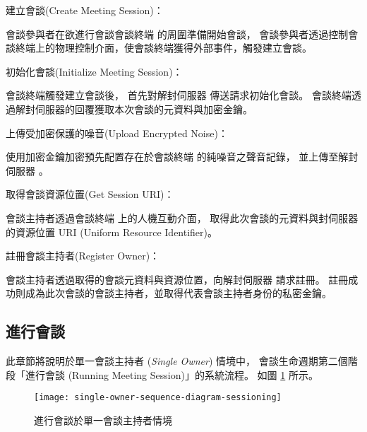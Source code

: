\begin{steps}
    \item 建立會談(Create Meeting Session)：

            會談參與者在欲進行會談會談終端 \DEFmeetingbox 的周圍準備開始會談，
        會談參與者透過控制會談終端上的物理控制介面，使會談終端獲得外部事件，觸發建立會談。

    \item 初始化會談(Initialize Meeting Session)：

            會談終端觸發建立會談後，
        首先對解封伺服器 \DEFserver 傳送請求初始化會談。
        會談終端透過解封伺服器的回覆獲取本次會談的元資料與加密金鑰。

    \item 上傳受加密保護的噪音(Upload Encrypted Noise)：

            使用加密金鑰加密預先配置存在於會談終端 \DEFmeetingbox 的純噪音之聲音記錄，
        並上傳至解封伺服器 \DEFserver。

    \item 取得會談資源位置(Get Session URI)：

            會談主持者透過會談終端 \DEFmeetingbox 上的人機互動介面，
        取得此次會談的元資料與封伺服器的資源位置 URI (Uniform Resource Identifier)。

    \item 註冊會談主持者(Register Owner)：

            會談主持者透過取得的會談元資料與資源位置，向解封伺服器 \DEFserver 請求註冊。
        註冊成功則成為此次會談的會談主持者，並取得代表會談主持者身份的私密金鑰。
\end{steps}


\subsection{進行會談}\label{subsec:sessioning}

    此章節將說明於單一會談主持者 ({\it Single Owner}) 情境中，
會談生命週期第二個階段「進行會談 (Running Meeting Session)」的系統流程。
如圖 \ref{fig:s-o-sessioning} 所示。

\begin{figure}[H]
    \centering
    \texttt{[image: single-owner-sequence-diagram-sessioning]}
    \caption{進行會談於單一會談主持者情境}\label{fig:s-o-sessioning}
\end{figure}

